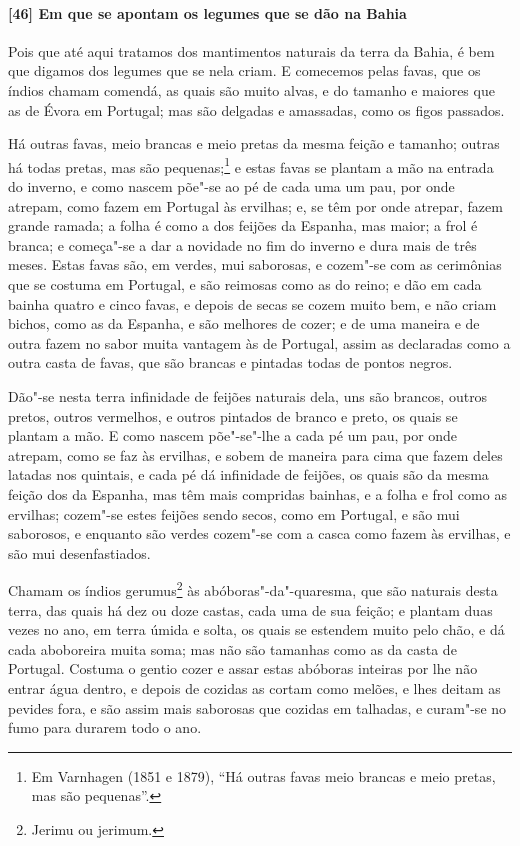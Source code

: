 \paragraph{[46] Em que se apontam os legumes que se dão na Bahia}\quad
Pois que até aqui tratamos dos mantimentos naturais da terra da Bahia, é bem que digamos
dos legumes que se nela criam. E comecemos pelas favas, que os índios chamam comendá, as
quais são muito alvas, e do tamanho e maiores que as de Évora em Portugal; mas são
delgadas e amassadas, como os figos passados.

Há outras favas, meio brancas e meio pretas da mesma feição e tamanho; outras há todas
pretas, mas são pequenas;\footnote{ Em Varnhagen (1851 e 1879), ``Há outras favas meio
brancas e meio pretas, mas são pequenas''.} e estas favas se plantam a mão na entrada do
inverno, e como nascem põe"-se ao pé de cada uma um pau, por onde atrepam, como fazem em
Portugal às ervilhas; e, se têm por onde atrepar, fazem grande ramada; a folha é como a
dos feijões da Espanha, mas maior; a frol é branca; e começa"-se a dar a novidade no fim do
inverno e dura mais de três meses. Estas favas são, em verdes, mui saborosas, e cozem"-se
com as cerimônias que se costuma em Portugal, e são reimosas como as do reino; e dão em
cada bainha quatro e cinco favas, e depois de secas se cozem muito bem, e não criam
bichos, como as da Espanha, e são melhores de cozer; e de uma maneira e de outra fazem no
sabor muita vantagem às de Portugal, assim as declaradas como a outra casta de favas, que
são brancas e pintadas todas de pontos negros.

Dão"-se nesta terra infinidade de feijões naturais dela, uns são brancos, outros pretos,
outros vermelhos, e outros pintados de branco e preto, os quais se plantam a mão. E como
nascem põe"-se"-lhe a cada pé um pau, por onde atrepam, como se faz às ervilhas, e sobem de
maneira para cima que fazem deles latadas nos quintais, e cada pé dá infinidade de
feijões, os quais são da mesma feição dos da Espanha, mas têm mais compridas bainhas, e a
folha e frol como as ervilhas; cozem"-se estes feijões sendo secos, como em Portugal, e são
mui saborosos, e enquanto são verdes cozem"-se com a casca como fazem às ervilhas, e são
mui desenfastiados.

Chamam os índios gerumus\footnote{ Jerimu ou jerimum.} às abóboras"-da"-quaresma, que são
naturais desta terra, das quais há dez ou doze castas, cada uma de sua feição; e plantam
duas vezes no ano, em terra úmida e solta, os quais se estendem muito pelo chão, e dá cada
aboboreira muita soma; mas não são tamanhas como as da casta de Portugal. Costuma o gentio
cozer e assar estas abóboras inteiras por lhe não entrar água dentro, e depois de cozidas
as cortam como melões, e lhes deitam as pevides fora, e são assim mais saborosas que
cozidas em talhadas, e curam"-se no fumo para durarem todo o ano.

